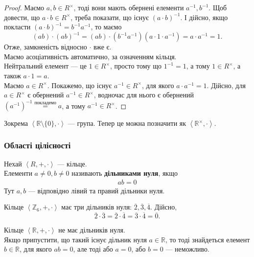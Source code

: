 \documentclass{math_library}
\begin{document}
\begin{proof}
Маємо $a,b \in R^\times$, тоді вони мають обернені елементи $a^{-1},b^{-1}$. Щоб довести, що $a \cdot b \in R^\times$, треба показати, що існує $(a \cdot b)^{-1}$. І дійсно, якщо покласти $(a \cdot b)^{-1} = b^{-1} a^{-1}$, то маємо
\[
(ab) \cdot (ab)^{-1} = (ab) \cdot (b^{-1}a^{-1}) (a \cdot 1 \cdot a^{-1}) = a \cdot a^{-1} = 1.
\]
Отже, замкненість відносно $\cdot$ вже є.\\
Маємо асоціативність автоматично, за означенням кільця.\\
Нейтральний елемент --- це $1 \in R^\times$, просто тому що $1^{-1} = 1$, а тому $1 \in R^\times$, а також $a \cdot 1 = a$.\\
Маємо $a \in R^\times$. Покажемо, що існує $a^{-1} \in R^\times$, для якого $a \cdot a^{-1} = 1$. Дійсно, для $a \in R^\times$ є обернений $a^{-1} \in R^\times$, водночас для нього є обернений $(a^{-1})^{-1} \overset{\text{покладемо}}{=} a$, а тому $a^{-1} \in R^\times$.
\end{proof}

\begin{example}
Зокрема $\left< \mathbb{R} \setminus \{0\}, \cdot \right>$ --- група. Тепер це можна позначити як $\left< \mathbb{R}^{\times}, \cdot \right>$.
\end{example}

\subsubsection{Області цілісності}
\begin{definition}
Нехай $\left<R,+,\cdot \right>$ --- кільце.\\
Елементи $a \neq 0,b \neq 0$ називають \textbf{дільниками нуля}, якщо
\begin{align*}
ab=0
\end{align*}
Тут $a,b$ --- відповідно лівий та правий дільники нуля.
\end{definition}

\begin{example}
Кільце $\left< \mathbb{Z}_6, +, \cdot \right>$ має три дільників нуля: $\overline{2}, \overline{3}, \overline{4}$. Дійсно,
\[
\overline{2} \cdot \overline{3} = \overline{2} \cdot \overline{4} = \overline{3} \cdot \overline{4} = \overline{0}.
\]
\end{example}

\begin{example}
Кільце $\left< \mathbb{R}, +, \cdot \right>$ не має дільників нуля.
\bigskip \\
Якщо припустити, що такий існує дільник нуля $a \in \mathbb{R}$, то тоді знайдеться елемент $b \in \mathbb{R}$, для якого $ab=0$, але тоді або $a = 0$, або $b = 0$ --- неможливо.
\end{example}
\end{document}
